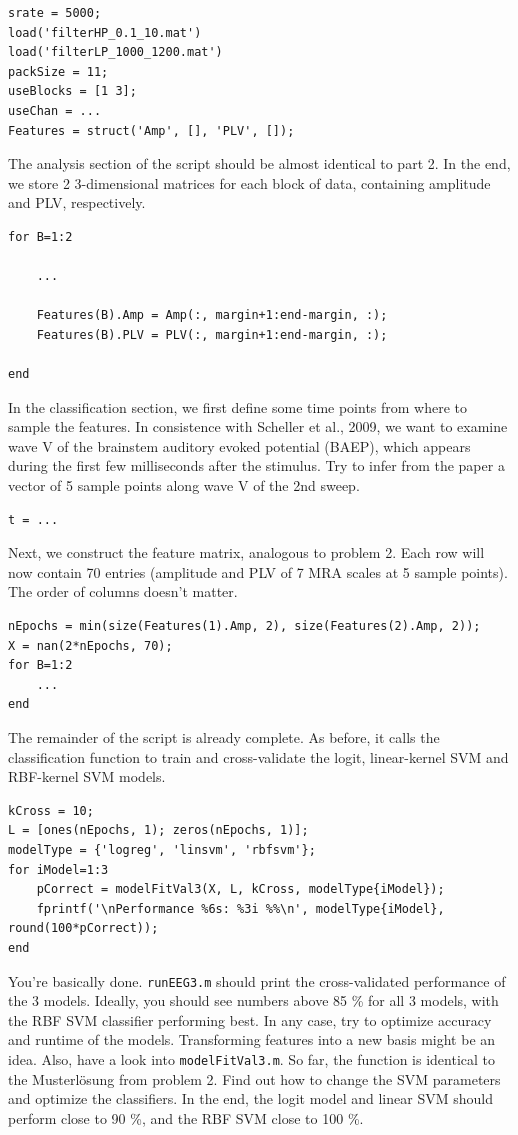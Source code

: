 \documentclass[10pt,a4paper,notitlepage]{report}
\begin{document}
\begin{verbatim}
srate = 5000;
load('filterHP_0.1_10.mat')
load('filterLP_1000_1200.mat')
packSize = 11;
useBlocks = [1 3];
useChan = ...
Features = struct('Amp', [], 'PLV', []);
\end{verbatim}

The analysis section of the script should be almost identical to part 2. In the end, we store 2 3-dimensional matrices for each block of data, containing amplitude and PLV, respectively.

\begin{verbatim}
for B=1:2

	...
	
    Features(B).Amp = Amp(:, margin+1:end-margin, :);
    Features(B).PLV = PLV(:, margin+1:end-margin, :);

end
\end{verbatim}

In the classification section, we first define some time points from where to sample the features. In consistence with Scheller et al., 2009, we want to examine wave V of the brainstem auditory evoked potential (BAEP), which appears during the first few milliseconds after the stimulus. Try to infer from the paper a vector of 5 sample points along wave V of the 2nd sweep.

\begin{verbatim}
t = ...
\end{verbatim}

Next, we construct the feature matrix, analogous to problem 2. Each row will now contain 70 entries (amplitude and PLV of 7 MRA scales at 5 sample points). The order of columns doesn't matter.

\begin{verbatim}
nEpochs = min(size(Features(1).Amp, 2), size(Features(2).Amp, 2));
X = nan(2*nEpochs, 70);
for B=1:2
    ...
end
\end{verbatim}

The remainder of the script is already complete. As before, it calls the classification function to train and cross-validate the logit, linear-kernel SVM and RBF-kernel SVM models.

\begin{verbatim}
kCross = 10;
L = [ones(nEpochs, 1); zeros(nEpochs, 1)];
modelType = {'logreg', 'linsvm', 'rbfsvm'};
for iModel=1:3
    pCorrect = modelFitVal3(X, L, kCross, modelType{iModel});
    fprintf('\nPerformance %6s: %3i %%\n', modelType{iModel}, round(100*pCorrect));
end
\end{verbatim}

You're basically done. \texttt{runEEG3.m} should print the cross-validated performance of the 3 models. Ideally, you should see numbers above 85 \% for all 3 models, with the RBF SVM classifier performing best. In any case, try to optimize accuracy and runtime of the models. Transforming features into a new basis might be an idea. Also, have a look into \texttt{modelFitVal3.m}. So far, the function is identical to the Musterlösung from problem 2. Find out how to change the SVM parameters and optimize the classifiers. In the end, the logit model and linear SVM should perform close to 90 \%, and the RBF SVM close to 100 \%.
\end{document}
